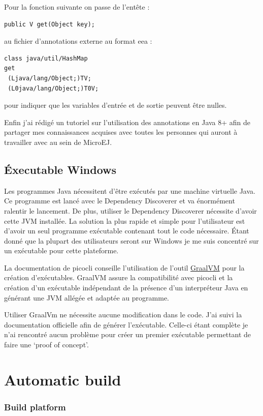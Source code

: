 \documentclass[french,a4paper,12pt]{report}
\begin{document}
Pour la fonction suivante on passe de l’entête :
\begin{lstlisting}
public V get(Object key);
\end{lstlisting}

au fichier d’annotations externe au format eea :

\begin{verbatim}
class java/util/HashMap
get
 (Ljava/lang/Object;)TV;
 (L0java/lang/Object;)T0V;
\end{verbatim}

pour indiquer que les variables d'entrée et de sortie peuvent être nulles.

Enfin j'ai rédigé un tutoriel sur l'utilisation des annotations en Java 8+ afin de partager mes connaissances acquises avec toutes les personnes qui auront à travailler avec au sein de MicroEJ.

\subsection{Éxecutable Windows}

Les programmes Java nécessitent d’être exécutés par une machine virtuelle Java. Ce programme est lancé avec le Dependency Discoverer et va énormément ralentir le lancement. De plus, utiliser le Dependency Discoverer nécessite d’avoir cette JVM installée. La solution la plus rapide et simple pour l’utilisateur est d’avoir un seul programme exécutable contenant tout le code nécessaire. Étant donné que la plupart des utilisateurs seront sur Windows je me suis concentré sur un exécutable pour cette plateforme.

La documentation de picocli conseille l’utilisation de l’outil \href{https://www.graalvm.org/}{GraalVM} pour la création d’exécutables. GraalVM assure la compatibilité avec picocli et la création d’un exécutable indépendant de la présence d'un interpréteur Java en générant une JVM allégée et adaptée au programme. 

Utiliser GraalVm ne nécessite aucune modification dans le code. J’ai suivi la documentation officielle afin de générer l’exécutable. Celle-ci étant complète je n’ai rencontré aucun problème pour créer un premier exécutable permettant de faire une ‘proof of concept’.


\section{Automatic build}

\subsubsection{Build platform}
\end{document}
